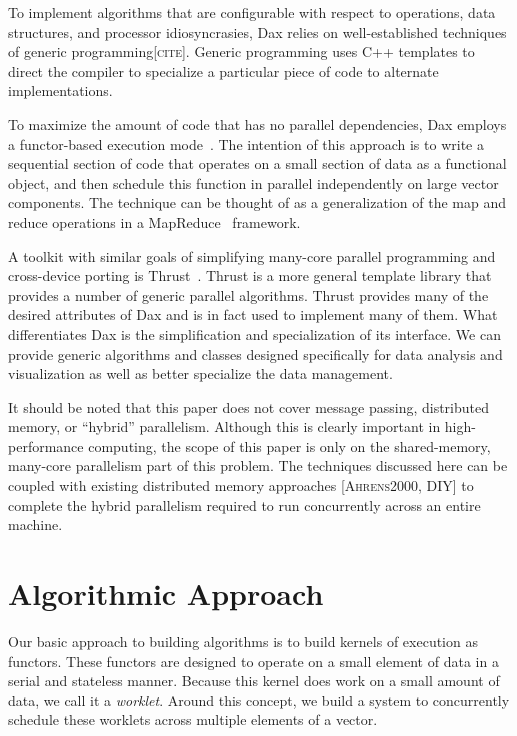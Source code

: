 \documentclass[conference]{IEEEtran}
\newcommand*{\lcite}[1]{~\cite{#1}}
\newcommand*{\keyterm}[1]{\emph{#1}}
\newcommand{\fix}[1]{{\color{red}\textsc{[#1]}}}
\begin{document}
\noindent
To implement algorithms that are configurable with respect to operations,
data structures, and processor idiosyncrasies, Dax relies on
well-established techniques of generic programming\fix{cite}.  Generic
programming uses C++ templates to direct the compiler to specialize a
particular piece of code to alternate implementations.

To maximize the amount of code that has no parallel dependencies, Dax
employs a functor-based execution mode\lcite{Baker2010}.  The intention of
this approach is to write a sequential section of code that operates on a
small section of data as a functional object, and then schedule this
function in parallel independently on large vector components.  The
technique can be thought of as a generalization of the map and reduce
operations in a MapReduce\lcite{MapReduce} framework.

A toolkit with similar goals of simplifying many-core parallel programming
and cross-device porting is Thrust\lcite{Thrust}.  Thrust is a more general
template library that provides a number of generic parallel algorithms.
Thrust provides many of the desired attributes of Dax and is in fact used
to implement many of them.  What differentiates Dax is the simplification
and specialization of its interface.  We can provide generic algorithms and
classes designed specifically for data analysis and visualization as well
as better specialize the data management.

It should be noted that this paper does not cover message passing,
distributed memory, or ``hybrid'' parallelism.  Although this is clearly
important in high-performance computing, the scope of this paper is only on
the shared-memory, many-core parallelism part of this problem.  The
techniques discussed here can be coupled with existing distributed memory
approaches \fix{Ahrens2000, DIY} to complete the hybrid parallelism
required to run concurrently across an entire machine.

\section{Algorithmic Approach}
\label{sec:AlgorithmicApproach}

\noindent
Our basic approach to building algorithms is to build kernels of execution
as functors.  These functors are designed to operate on a small element of
data in a serial and stateless manner.  Because this kernel does work on a
small amount of data, we call it a \keyterm{worklet}.  Around this concept,
we build a system to concurrently schedule these worklets across multiple
elements of a vector.
\end{document}
